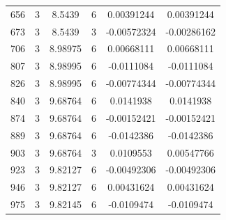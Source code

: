 \documentclass[11pt]{article}
\begin{document}
\begin{longtable} {c c c c c c}
656&	3&	8.5439& 	6&	0.00391244&	0.00391244\\
673&	3&	8.5439& 	3&	-0.00572324&	-0.00286162\\
706&	3&	8.98975& 	6&	0.00668111&	0.00668111\\
807&	3&	8.98995& 	6&	-0.0111084&	-0.0111084\\
826&	3&	8.98995&	6&	-0.00774344&	-0.00774344\\
840&	3&	9.68764&	6&	0.0141938&	0.0141938\\
874&	3&	9.68764&	6&	-0.00152421&	-0.00152421\\
889&	3&	9.68764&	6&	-0.0142386&	-0.0142386\\
903&	3&	9.68764&	3&	0.0109553&	0.00547766\\
923&	3&	9.82127&	6&	-0.00492306&	-0.00492306\\
946&	3&	9.82127&	6&	0.00431624&	0.00431624\\
975&	3&	9.82145&	6&	-0.0109474&	-0.0109474\\
\end{longtable}
\end{document}
